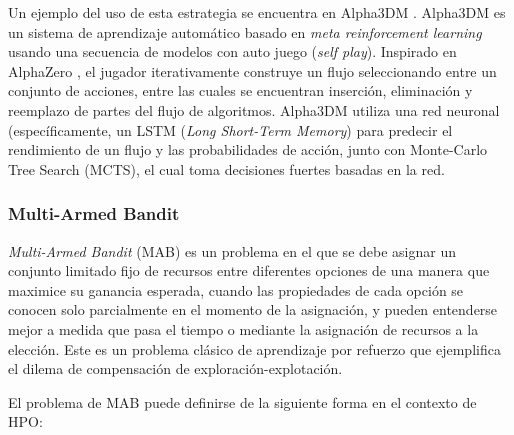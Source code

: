 Un ejemplo del uso de esta estrategia se encuentra en Alpha3DM \cite{drori2018alphad3m}. Alpha3DM es un sistema de aprendizaje automático basado en \textit{meta reinforcement learning} usando una secuencia de modelos con auto juego (\textit{self play}). Inspirado en AlphaZero \cite{alphazero}, el jugador iterativamente construye un flujo seleccionando entre un conjunto de acciones, entre las cuales se encuentran inserción, eliminación y reemplazo de partes del flujo de algoritmos. Alpha3DM utiliza una red neuronal (específicamente, un LSTM (\textit{Long Short-Term Memory}) para predecir el rendimiento de un flujo y las probabilidades de acción, junto con Monte-Carlo Tree Search (MCTS), el cual toma decisiones fuertes basadas en la red.

\subsubsection{Multi-Armed Bandit}



\textit{Multi-Armed Bandit} (MAB) es un problema en el que se debe asignar un conjunto limitado fijo de recursos entre diferentes opciones de una manera que maximice su ganancia esperada, cuando las propiedades de cada opción se conocen solo parcialmente en el momento de la asignación, y pueden entenderse mejor a medida que pasa el tiempo o mediante la asignación de recursos a la elección. Este es un problema clásico de aprendizaje por refuerzo que ejemplifica el dilema de compensación de exploración-explotación.

El problema de MAB puede definirse de la siguiente forma en el contexto de HPO:

